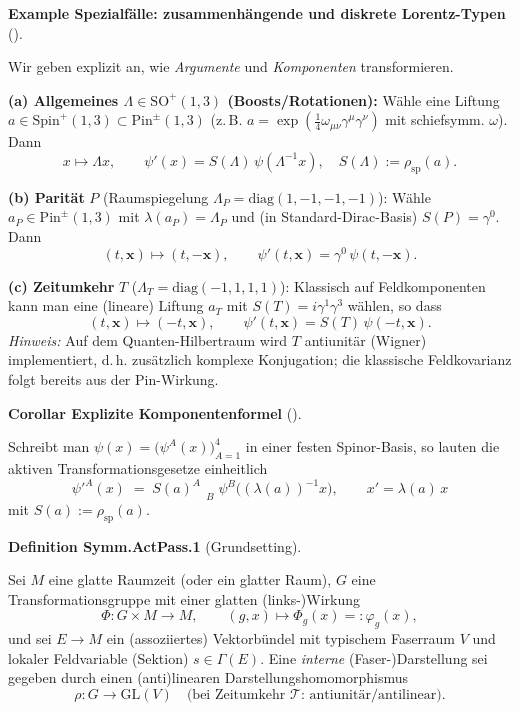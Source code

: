 \documentclass[10pt, letterpaper]{article}
\newcommand{\GL}{\mathrm{GL}}
\newcommand{\SO}{\mathrm{SO}}
\newcommand{\Spin}{\mathrm{Spin}}
\newcommand{\Pin}{\mathrm{Pin}}
\newcommand{\CustomHeading}[3]{%
  \par\medskip\noindent%
  \textbf{#1 #2} \textnormal{(#3)}.\enskip%
}
\newenvironment{DEF}[2]{\begin{unitbox}\CustomHeading{Definition}{#1}{#2}}{\end{unitbox}}
\newenvironment{KORO}[2]{\begin{unitbox}\CustomHeading{Corollar}{#1}{#2}}{\end{unitbox}}
\newenvironment{EXA}[2]{\begin{unitbox}\CustomHeading{Example}{#1}{#2}}{\end{unitbox}}
\begin{document}
\begin{EXA}{Spezialfälle: zusammenhängende und diskrete Lorentz-Typen}{}
Wir geben explizit an, wie \emph{Argumente} und \emph{Komponenten} transformieren.

\smallskip
\noindent
\textbf{(a) Allgemeines $\Lambda\in \SO^+(1,3)$ (Boosts/Rotationen):}
Wähle eine Liftung $a\in \Spin^+(1,3)\subset \Pin^{\pm}(1,3)$ (z.\,B. $a=\exp(\tfrac14\omega_{\mu\nu}\gamma^\mu\gamma^\nu)$
mit schiefsymm. $\omega$).
Dann
\[
x\mapsto \Lambda x,\qquad
\psi'(x)=S(\Lambda)\,\psi(\Lambda^{-1}x),\quad S(\Lambda):=\rho_{\mathrm{sp}}(a).
\]

\noindent
\textbf{(b) Parität} $P$ (Raumspiegelung $\Lambda_P=\mathrm{diag}(1,-1,-1,-1)$):
Wähle $a_P\in \Pin^{\pm}(1,3)$ mit $\lambda(a_P)=\Lambda_P$ und (in Standard-Dirac-Basis) $S(P)=\gamma^0$.
Dann
\[
(t,\mathbf x)\mapsto (t,-\mathbf x),\qquad
\psi'(t,\mathbf x)=\gamma^0\,\psi(t,-\mathbf x).
\]

\noindent
\textbf{(c) Zeitumkehr} $T$ ($\Lambda_T=\mathrm{diag}(-1,1,1,1)$):
Klassisch auf Feldkomponenten kann man eine (lineare) Liftung $a_T$ mit
$S(T)=i\gamma^1\gamma^3$ wählen, so dass
\[
(t,\mathbf x)\mapsto (-t,\mathbf x),\qquad
\psi'(t,\mathbf x)=S(T)\,\psi(-t,\mathbf x).
\]
\emph{Hinweis:} Auf dem Quanten-Hilbertraum wird $T$ antiunitär (Wigner) implementiert,
d.\,h. zusätzlich komplexe Konjugation; die klassische Feldkovarianz folgt bereits aus
der Pin-Wirkung.
\end{EXA}

\begin{KORO}{Explizite Komponentenformel}{}
Schreibt man $\psi(x)=\big(\psi^A(x)\big)_{A=1}^4$ in einer festen Spinor-Basis,
so lauten die aktiven Transformationsgesetze einheitlich
\[
\boxed{\;
\psi'^A(x)\;=\;{S(a)^A}_{\;\;B}\;\psi^B\!\big((\lambda(a))^{-1}x\big),\qquad
x'=\lambda(a)\,x
\;}
\]
mit $S(a):=\rho_{\mathrm{sp}}(a)$.
\end{KORO}


\begin{DEF}{Symm.ActPass.1}{Grundsetting}
Sei $M$ eine glatte Raumzeit (oder ein glatter Raum), $G$ eine Transformationsgruppe mit einer glatten (links-)Wirkung
\[
\Phi:G\times M\to M,\qquad (g,x)\mapsto \Phi_g(x)=:\varphi_g(x),
\]
und sei $E\to M$ ein (assoziiertes) Vektorbündel mit typischem Faserraum $V$ und lokaler Feldvariable (Sektion) $s\in\Gamma(E)$.
Eine \emph{interne} (Faser-)Darstellung sei gegeben durch einen (anti)linearen Darstellungs\-homomorphismus
\[
\rho:G\to \GL(V)\quad\text{(bei Zeitumkehr $\mathcal T$: antiunitär/antilinear)}.
\]
\end{DEF}
\end{document}

